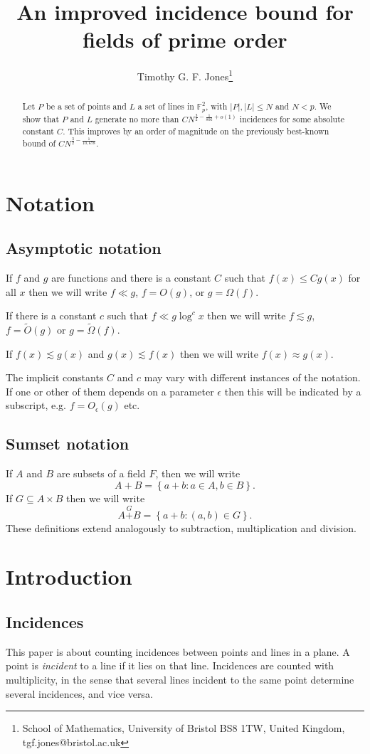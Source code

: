 \documentclass[12pt]{article}
\title{An improved incidence bound for fields of prime order}
\author{Timothy G. F. Jones\footnote{School of Mathematics, University of Bristol BS8 1TW, United Kingdom, tgf.jones@bristol.ac.uk}}
\date{}
\begin{document}
\maketitle
\begin{abstract}
Let $P$ be a set of points and $L$ a set of lines in $\mathbb{F}_p^2$, with $|P|,|L|\leq N$ and $N<p$. We show that $P$ and $L$ generate no more than $C N^{\frac{3}{2}-\frac{1}{806}+o(1)}$ incidences for some absolute constant $C$. This improves by an order of magnitude on the previously best-known bound of $C N^{\frac{3}{2}-\frac{1}{10,678}}$.
\end{abstract}


\section*{Notation}
\subsection*{Asymptotic notation}
If $f$ and $g$ are functions and there is a constant $C$ such that $f(x)\leq C g(x)$ for all $x$ then we will write $f\ll g$, $f=O(g)$, or $g=\Omega(f)$. 

If there is a constant $c$ such that $f \ll g \log^c x$ then we will write $f \lesssim g$, $f=\widetilde{O}(g)$ or $g=\widetilde{\Omega}(f)$.

If $f(x) \lesssim g(x)$ and $g(x) \lesssim f(x)$ then we will write $f(x) \approx g(x)$. 

The implicit constants $C$ and $c$ may vary with different instances of the notation. If one or other of them depends on a parameter $\epsilon$ then this will be indicated by a subscript, e.g. $f=O_{\epsilon}(g)$ etc.
\subsection*{Sumset notation}
If $A$ and $B$ are subsets of a field $F$, then we will write 
$$A+B=\left\{a+b:a \in A, b \in B\right\}.$$
If $G \subseteq A \times B$ then we will write
$$A\stackrel{G}{+}B=\left\{a+b:(a,b)\in G\right\}.$$
These definitions extend analogously to subtraction, multiplication and division.

\section{Introduction}
\subsection{Incidences}
This paper is about counting incidences between points and lines in a plane. A point is \textit{incident} to a line if it lies on that line. Incidences are counted with multiplicity, in the sense that several lines incident to the same point determine several incidences, and vice versa.
\end{document}
